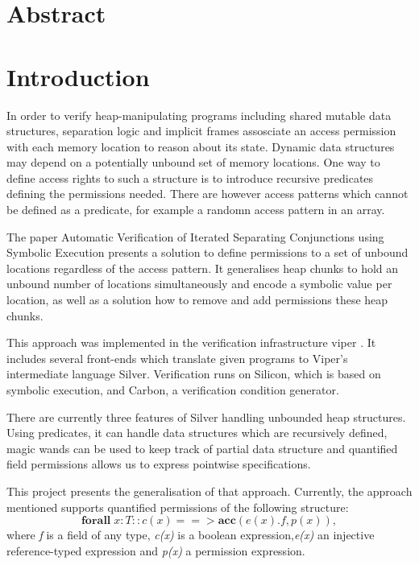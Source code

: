 \documentclass[12pt]{article}
\begin{document}
\maketitle
\newpage
\section{Abstract}
\section{Introduction}
In order to verify heap-manipulating programs including shared mutable data structures, separation logic\cite{reynolds2002separation} and implicit frames\cite{smans2009implicit} assosciate an access permission with each memory location to reason about its state. 
Dynamic data structures may depend on a potentially unbound set of memory locations. One way to define access rights to such a structure is to introduce recursive predicates defining the permissions needed. There are however access patterns which cannot be defined as a predicate, for example a randomn access pattern in an array.

The paper Automatic Verification of Iterated Separating Conjunctions using Symbolic Execution\cite{isc} presents a solution to define permissions to a set of unbound locations regardless of the access pattern. It generalises heap chunks to hold an unbound number of locations simultaneously and encode a symbolic value per location, as well as a solution how to remove and add permissions these heap chunks.

This approach was implemented in the verification infrastructure viper \cite{viper}. It includes several front-ends which translate given programs to Viper's intermediate language Silver. Verification runs on Silicon, which is based on symbolic execution, and Carbon, a verification condition generator.

There are currently three features of Silver handling unbounded heap structures. Using predicates, it can handle data structures which are recursively defined, magic wands \cite{magicwand} can be used to keep track of partial data structure and quantified field permissions \cite{isc} allows us to express pointwise specifications. 

This project presents the generalisation of that approach. Currently, the approach mentioned supports quantified permissions of the following structure:
\begin{equation}
	\mathbf{forall} \; x:T :: c(x) ==>\mathbf{acc}( e(x).f, p(x) ) ,
\end{equation}
where {\it f} is a field of any type, {\it c(x)} is  a boolean expression,{\it e(x)} an injective reference-typed expression and {\it p(x)} a permission expression.
\end{document}
